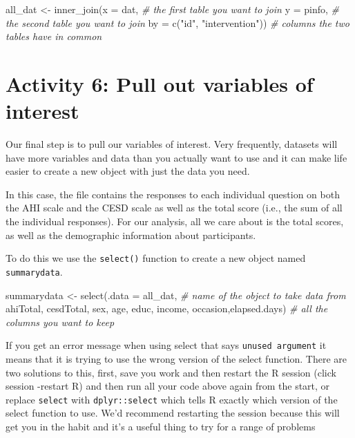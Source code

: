 \documentclass[
  oneside]{book}
\newenvironment{Shaded}{\begin{snugshade}}{\end{snugshade}}
\newcommand{\AttributeTok}[1]{\textcolor[rgb]{0.77,0.63,0.00}{#1}}
\newcommand{\CommentTok}[1]{\textcolor[rgb]{0.56,0.35,0.01}{\textit{#1}}}
\newcommand{\FunctionTok}[1]{\textcolor[rgb]{0.00,0.00,0.00}{#1}}
\newcommand{\NormalTok}[1]{#1}
\newcommand{\OtherTok}[1]{\textcolor[rgb]{0.56,0.35,0.01}{#1}}
\newcommand{\StringTok}[1]{\textcolor[rgb]{0.31,0.60,0.02}{#1}}
\begin{document}
\begin{Shaded}
\begin{Highlighting}[]
\NormalTok{all\_dat }\OtherTok{\textless{}{-}} \FunctionTok{inner\_join}\NormalTok{(}\AttributeTok{x =}\NormalTok{ dat, }\CommentTok{\# the first table you want to join}
                      \AttributeTok{y =}\NormalTok{ pinfo, }\CommentTok{\# the second table you want to join}
                      \AttributeTok{by =} \FunctionTok{c}\NormalTok{(}\StringTok{"id"}\NormalTok{, }\StringTok{"intervention"}\NormalTok{)) }\CommentTok{\# columns the two tables have in common}
\end{Highlighting}
\end{Shaded}

\hypertarget{activity-6-pull-out-variables-of-interest}{%
\section{Activity 6: Pull out variables of interest}\label{activity-6-pull-out-variables-of-interest}}

Our final step is to pull our variables of interest. Very frequently, datasets will have more variables and data than you actually want to use and it can make life easier to create a new object with just the data you need.

In this case, the file contains the responses to each individual question on both the AHI scale and the CESD scale as well as the total score (i.e., the sum of all the individual responses). For our analysis, all we care about is the total scores, as well as the demographic information about participants.

To do this we use the \texttt{select()} function to create a new object named \texttt{summarydata}.

\begin{Shaded}
\begin{Highlighting}[]
\NormalTok{summarydata }\OtherTok{\textless{}{-}} \FunctionTok{select}\NormalTok{(}\AttributeTok{.data =}\NormalTok{ all\_dat, }\CommentTok{\# name of the object to take data from}
\NormalTok{                      ahiTotal, cesdTotal, sex, age, educ, income, occasion,elapsed.days) }\CommentTok{\# all the columns you want to keep}
\end{Highlighting}
\end{Shaded}

\begin{danger}
If you get an error message when using select that says
\texttt{unused\ argument} it means that it is trying to use the wrong
version of the select function. There are two solutions to this, first,
save you work and then restart the R session (click session -restart R)
and then run all your code above again from the start, or replace
\texttt{select} with \texttt{dplyr::select} which tells R exactly which
version of the select function to use. We'd recommend restarting the
session because this will get you in the habit and it's a useful thing
to try for a range of problems
\end{danger}
\end{document}
